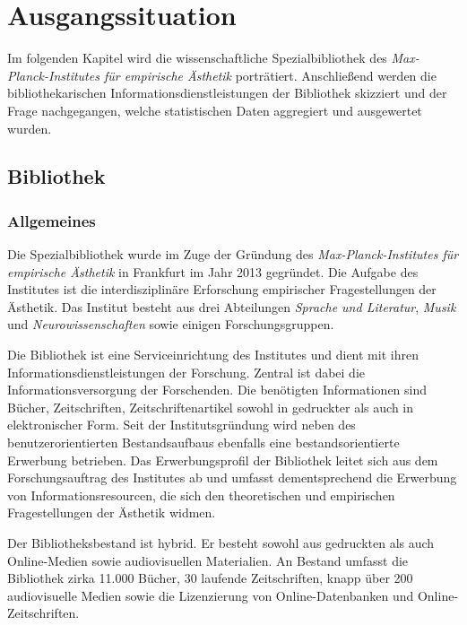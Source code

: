 \chapter{Ausgangssituation}



Im folgenden Kapitel wird die wissenschaftliche Spezialbibliothek des \textit{Max-Planck-Institutes für empirische Ästhetik} 
porträtiert. Anschließend werden die bibliothekarischen Informationsdienstleistungen der Bibliothek 
skizziert und der Frage nachgegangen, welche statistischen Daten aggregiert und ausgewertet wurden. 

\section{Bibliothek}
\subsection{Allgemeines}
Die Spezialbibliothek wurde im Zuge der Gründung des \textit{Max-Planck-Institutes für empirische Ästhetik} 
in Frankfurt im Jahr 2013 gegründet. Die Aufgabe des Institutes ist die interdisziplinäre Erforschung 
empirischer Fragestellungen der Ästhetik. Das Institut besteht aus drei Abteilungen \textit{Sprache und Literatur}, 
\textit{Musik} und \textit{Neurowissenschaften} sowie einigen Forschungsgruppen. %



Die Bibliothek ist eine Serviceinrichtung des Institutes und dient mit ihren Informationsdienstleistungen 
der Forschung.
Zentral ist dabei die Informationsversorgung der Forschenden. Die benötigten Informationen sind Bücher, 
Zeitschriften, Zeitschriftenartikel sowohl in gedruckter als auch in elektronischer Form.
Seit der Institutsgründung wird neben des benutzerorientierten Bestandsaufbaus ebenfalls eine bestandsorientierte 
Erwerbung betrieben. Das Erwerbungsprofil der Bibliothek leitet sich aus dem Forschungsauftrag des Institutes 
ab und umfasst dementsprechend die Erwerbung von Informationsresourcen, die sich den theoretischen und 
empirischen Fragestellungen der Ästhetik widmen.

Der Bibliotheksbestand ist hybrid. Er besteht sowohl aus gedruckten als auch Online-Medien sowie 
audiovisuellen Materialien. An Bestand umfasst die Bibliothek zirka 11.000 Bücher, 30 laufende Zeitschriften, 
knapp über 200 audiovisuelle Medien sowie die Lizenzierung von Online-Datenbanken
und Online-Zeitschriften.

